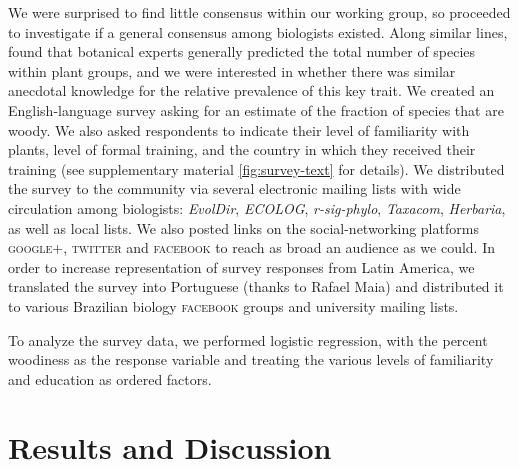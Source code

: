 \documentclass[12pt]{article}
\begin{document}
We were surprised to find little consensus within our working group,
so proceeded to investigate if a general consensus among
biologists existed.
% 
Along similar lines, \citet{joppa2010} found that botanical experts generally predicted the
total number of species within plant groups, and we were interested in
whether there was similar anecdotal knowledge for the relative prevalence of
this key trait.
%
We created an English-language survey asking for an estimate of the
fraction of species that are woody.  We also asked respondents to
indicate their level of familiarity with plants, level of formal
training, and the country in which they received their training (see
supplementary material \ref{fig:survey-text} for details).
We distributed the survey to the community via several electronic
mailing lists with wide circulation among biologists: \emph{EvolDir},
\emph{ECOLOG}, \emph{r-sig-phylo}, \emph{Taxacom}, \emph{Herbaria}, as
well as local lists. We also posted links on the social-networking platforms \textsc{google+},
\textsc{twitter} and \textsc{facebook} to reach as broad an audience
as we could.
In order to increase representation of survey responses from Latin
America, we translated the survey into Portuguese (thanks to Rafael
Maia) and distributed it to various Brazilian biology
\textsc{facebook} groups and university mailing lists.

To analyze the survey data, we performed logistic regression, with the percent woodiness as the response variable \citep[for discussion as to why we used logistic regression, see][]{wartonarcsine} and treating the various levels of familiarity and education as ordered factors.


\section{Results and Discussion}

\end{document}
